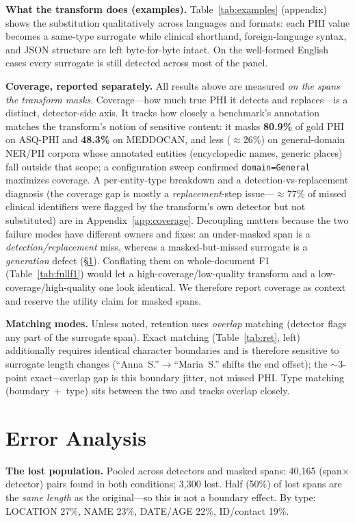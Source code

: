 \documentclass[pmlr,twocolumn,10pt]{jmlr}
\newcommand{\tp}[1]{\texttt{#1}}
\begin{document}
\textbf{What the transform does (examples).} Table~\ref{tab:examples} (appendix) shows the substitution qualitatively across languages and formats: each PHI value becomes a same-type surrogate while clinical shorthand, foreign-language syntax, and JSON structure are left byte-for-byte intact. On the well-formed English cases every surrogate is still detected across most of the panel.

\textbf{Coverage, reported separately.} All results above are measured \emph{on the spans the transform masks}. Coverage---how much true PHI it detects and replaces---is a distinct, detector-side axis. It tracks how closely a benchmark's annotation matches the transform's notion of sensitive content: it masks \textbf{80.9\%} of gold PHI on ASQ-PHI and \textbf{48.3\%} on MEDDOCAN, and less ($\approx$26\%) on general-domain NER/PII corpora whose annotated entities (encyclopedic names, generic places) fall outside that scope; a configuration sweep confirmed \tp{domain=General} maximizes coverage. A per-entity-type breakdown and a detection-vs-replacement diagnosis (the coverage gap is mostly a \emph{replacement}-step issue---$\approx$77\% of missed clinical identifiers were flagged by the transform's own detector but not substituted) are in Appendix~\ref{app:coverage}. Decoupling matters because the two failure modes have different owners and fixes: an under-masked span is a \emph{detection/replacement} miss, whereas a masked-but-missed surrogate is a \emph{generation} defect (§\ref{sec:error}). Conflating them on whole-document F1 (Table~\ref{tab:fullf1}) would let a high-coverage/low-quality transform and a low-coverage/high-quality one look identical. We therefore report coverage as context and reserve the utility claim for masked spans.

\textbf{Matching modes.} Unless noted, retention uses \emph{overlap} matching (detector flags any part of the surrogate span). Exact matching (Table~\ref{tab:ret}, left) additionally requires identical character boundaries and is therefore sensitive to surrogate length changes (``Anna~S.''$\rightarrow$``Maria~S.'' shifts the end offset); the $\sim$3-point exact$-$overlap gap is this boundary jitter, not missed PHI. Type matching (boundary~+~type) sits between the two and tracks overlap closely.

\section{Error Analysis}\label{sec:error}
\textbf{The lost population.} Pooled across detectors and masked spans: 40{,}165 (span$\times$detector) pairs found in both conditions; 3{,}300 lost. Half (50\%) of lost spans are the \emph{same length} as the original---so this is not a boundary effect. By type: LOCATION 27\%, NAME 23\%, DATE/AGE 22\%, ID/contact 19\%.
\end{document}
